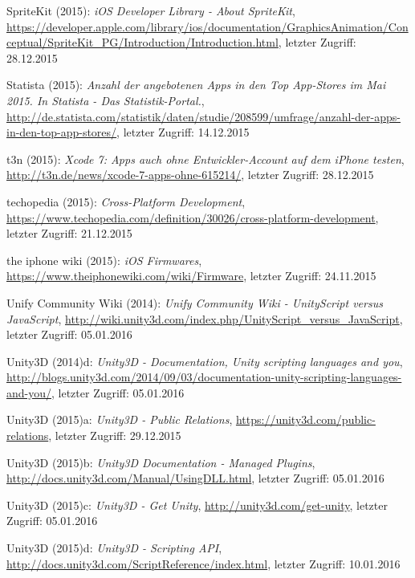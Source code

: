 \begin{thebibliography}{}
SpriteKit (2015): \emph{iOS Developer Library - About SpriteKit},
\url{https://developer.apple.com/library/ios/documentation/GraphicsAnimation/Conceptual/SpriteKit_PG/Introduction/Introduction.html}, letzter Zugriff: 28.12.2015

Statista (2015): \emph{Anzahl der angebotenen Apps in den Top App-Stores im Mai 2015. In Statista - Das Statistik-Portal.},
\url{http://de.statista.com/statistik/daten/studie/208599/umfrage/anzahl-der-apps-in-den-top-app-stores/}, letzter Zugriff: 14.12.2015

t3n (2015): \emph{Xcode 7: Apps auch ohne Entwickler-Account auf dem iPhone testen},
\url{http://t3n.de/news/xcode-7-apps-ohne-615214/}, letzter Zugriff: 28.12.2015

techopedia (2015): \emph{Cross-Platform Development},
\url{https://www.techopedia.com/definition/30026/cross-platform-development}, letzter Zugriff: 21.12.2015

the iphone wiki (2015): \emph{iOS Firmwares},
\url{https://www.theiphonewiki.com/wiki/Firmware}, letzter Zugriff: 24.11.2015

Unify Community Wiki (2014): \emph{Unify Community Wiki - UnityScript versus JavaScript},
\url{http://wiki.unity3d.com/index.php/UnityScript_versus_JavaScript}, letzter Zugriff: 05.01.2016

Unity3D (2014)d: \emph{Unity3D - Documentation, Unity scripting languages and you},
\url{http://blogs.unity3d.com/2014/09/03/documentation-unity-scripting-languages-and-you/}, letzter Zugriff: 05.01.2016

Unity3D (2015)a: \emph{Unity3D - Public Relations},
\url{https://unity3d.com/public-relations}, letzter Zugriff: 29.12.2015

Unity3D (2015)b: \emph{Unity3D Documentation - Managed Plugins},
\url{http://docs.unity3d.com/Manual/UsingDLL.html}, letzter Zugriff: 05.01.2016

Unity3D (2015)c: \emph{Unity3D - Get Unity},
\url{http://unity3d.com/get-unity}, letzter Zugriff: 05.01.2016

Unity3D (2015)d: \emph{Unity3D - Scripting API},
\url{http://docs.unity3d.com/ScriptReference/index.html}, letzter Zugriff: 10.01.2016


\end{thebibliography}
